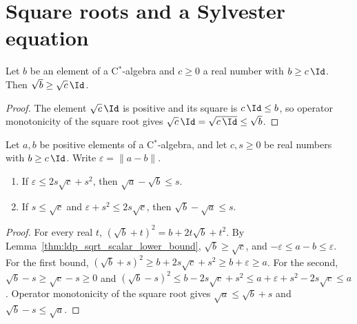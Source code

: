\section{Square roots and a Sylvester equation}
\label{sec:perturbations_square_roots}

\begin{lemma}
    \label{thm:ldp_sqrt_scalar_lower_bound}
    \leanok
    Let $b$ be an element of a C$^*$-algebra and $c\ge0$ a real number with
    $b\ge c\,\Id$. Then $\sqrt b\ge\sqrt c\,\Id$.
\end{lemma}
\begin{proof}
    \leanok
    The element $\sqrt c\,\Id$ is positive and its square is $c\,\Id\le b$, so
    operator monotonicity of the square root gives
    $\sqrt c\,\Id=\sqrt{c\,\Id}\le\sqrt b$.
\end{proof}

\begin{lemma}
    \label{lem:ldp_sqrt_floor_bounds}
    \leanok
    Let $a,b$ be positive elements of a C$^*$-algebra, and let $c,s\ge0$ be
    real numbers with $b\ge c\,\Id$. Write $\varepsilon=\lVert a-b\rVert$.
    \begin{enumerate}
        \item If $\varepsilon\le2s\sqrt c+s^2$, then $\sqrt a-\sqrt b\le s$.
        \item If $s\le\sqrt c$ and $\varepsilon+s^2\le2s\sqrt c$, then
              $\sqrt b-\sqrt a\le s$.
    \end{enumerate}
\end{lemma}
\begin{proof}
    \leanok
    For every real $t$,
    $(\sqrt b+t)^2=b+2t\sqrt b+t^2$. By
    Lemma~\ref{thm:ldp_sqrt_scalar_lower_bound}, $\sqrt b\ge\sqrt c$, and
    $-\varepsilon\le a-b\le\varepsilon$. For the first bound,
    $(\sqrt b+s)^2\ge b+2s\sqrt c+s^2\ge b+\varepsilon\ge a$. For the second,
    $\sqrt b-s\ge\sqrt c-s\ge0$ and
    $(\sqrt b-s)^2\le b-2s\sqrt c+s^2\le a+\varepsilon+s^2-2s\sqrt c\le a$.
    Operator monotonicity of the square root gives $\sqrt a\le\sqrt b+s$ and
    $\sqrt b-s\le\sqrt a$.
\end{proof}

